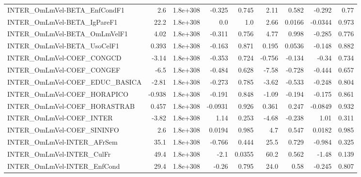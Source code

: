 \begin{tabular}{lrrrrrrrr}
INTER\_OmLmVel-BETA\_EnfCondF1          &         2.6 &     1.8e+308 &  -0.325 &    0.745 &       2.11 &       0.582 &       -0.292 &          0.77 \\
INTER\_OmLmVel-BETA\_IgPareF1           &        22.2 &     1.8e+308 &     0.0 &      1.0 &       2.66 &      0.0166 &      -0.0344 &         0.973 \\
INTER\_OmLmVel-BETA\_OmLmVelF1          &        4.02 &     1.8e+308 &  -0.311 &    0.756 &       4.77 &       0.998 &       -0.285 &         0.776 \\
INTER\_OmLmVel-BETA\_UsoCelF1           &       0.393 &     1.8e+308 &  -0.163 &    0.871 &      0.195 &      0.0536 &       -0.148 &         0.882 \\
INTER\_OmLmVel-COEF\_CONGCD             &       -3.14 &     1.8e+308 &  -0.353 &    0.724 &     -0.756 &      -0.134 &        -0.34 &         0.734 \\
INTER\_OmLmVel-COEF\_CONGEF             &        -6.5 &     1.8e+308 &  -0.484 &    0.628 &      -7.58 &      -0.728 &       -0.444 &         0.657 \\
INTER\_OmLmVel-COEF\_EDUC\_BASICA        &       -2.81 &     1.8e+308 &  -0.273 &    0.785 &      -3.62 &      -0.533 &       -0.248 &         0.804 \\
INTER\_OmLmVel-COEF\_HORAPICO           &      -0.938 &     1.8e+308 &  -0.191 &    0.848 &      -1.09 &      -0.194 &       -0.175 &         0.861 \\
INTER\_OmLmVel-COEF\_HORASTRAB          &       0.457 &     1.8e+308 & -0.0931 &    0.926 &      0.361 &       0.247 &      -0.0849 &         0.932 \\
INTER\_OmLmVel-COEF\_INTER              &       -3.82 &     1.8e+308 &    1.14 &    0.253 &      -4.68 &      -0.238 &         1.01 &         0.311 \\
INTER\_OmLmVel-COEF\_SININFO            &         2.6 &     1.8e+308 &  0.0194 &    0.985 &        4.7 &       0.547 &       0.0182 &         0.985 \\
INTER\_OmLmVel-INTER\_AFrSem            &        35.1 &     1.8e+308 &  -0.766 &    0.444 &       25.5 &       0.729 &       -0.984 &         0.325 \\
INTER\_OmLmVel-INTER\_CulFr             &        49.4 &     1.8e+308 &    -2.1 &   0.0355 &       60.2 &       0.562 &        -1.48 &         0.139 \\
INTER\_OmLmVel-INTER\_EnfCond           &        29.4 &     1.8e+308 &   -0.26 &    0.795 &       24.0 &        0.58 &       -0.245 &         0.807 \\

\end{tabular}
